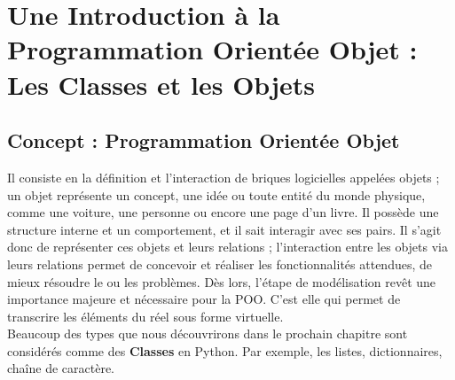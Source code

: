 \documentclass[12pt,fleqn]{report} %
\begin{document}
\pageDeGarde




\pagestyle{empty} %

\clearpage
\setcounter{page}{1}

%

\pagestyle{fancy} %


\setcounter{chapter}{0}

%

%





\chapter{Une Introduction à la Programmation Orientée Objet : Les Classes et les Objets}

\section{Concept : Programmation Orientée Objet}


	Il consiste en la définition et l'interaction de briques logicielles appelées objets ; un objet représente un concept, une idée ou toute entité du monde physique, comme une voiture, une personne ou encore une page d'un livre. Il possède une structure interne et un comportement, et il sait interagir avec ses pairs. Il s'agit donc de représenter ces objets et leurs relations ; l'interaction entre les objets via leurs relations permet de concevoir et réaliser les fonctionnalités attendues, de mieux résoudre le ou les problèmes. Dès lors, l'étape de modélisation revêt une importance majeure et nécessaire pour la POO. C'est elle qui permet de transcrire les éléments du réel sous forme virtuelle.\\


Beaucoup des types que nous découvrirons dans le prochain chapitre sont considérés comme des \textbf{Classes} en Python. Par exemple, les listes, dictionnaires, chaîne de caractère.
\end{document}
